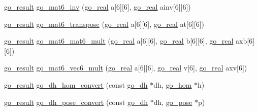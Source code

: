 \begin{DoxyCompactItemize}
\item 
\hyperlink{gotypes_8h_a55d48b38cd959f63c7e8db8337a9792a}{go\-\_\-result} \hyperlink{namespacegomotion_a6949f4b722debfa65cf5a2b84dc27a87}{go\-\_\-mat6\-\_\-inv} (\hyperlink{gotypes_8h_afd666a2393eebd71ee455846ac9def9b}{go\-\_\-real} a\mbox{[}6\mbox{]}\mbox{[}6\mbox{]}, \hyperlink{gotypes_8h_afd666a2393eebd71ee455846ac9def9b}{go\-\_\-real} ainv\mbox{[}6\mbox{]}\mbox{[}6\mbox{]})
\item 
\hyperlink{gotypes_8h_a55d48b38cd959f63c7e8db8337a9792a}{go\-\_\-result} \hyperlink{namespacegomotion_a8508fd2b999bdb9dc69e4394b42befe1}{go\-\_\-mat6\-\_\-transpose} (\hyperlink{gotypes_8h_afd666a2393eebd71ee455846ac9def9b}{go\-\_\-real} a\mbox{[}6\mbox{]}\mbox{[}6\mbox{]}, \hyperlink{gotypes_8h_afd666a2393eebd71ee455846ac9def9b}{go\-\_\-real} at\mbox{[}6\mbox{]}\mbox{[}6\mbox{]})
\item 
\hyperlink{gotypes_8h_a55d48b38cd959f63c7e8db8337a9792a}{go\-\_\-result} \hyperlink{namespacegomotion_a95d11938285c9d68ae2816f8659624d4}{go\-\_\-mat6\-\_\-mat6\-\_\-mult} (\hyperlink{gotypes_8h_afd666a2393eebd71ee455846ac9def9b}{go\-\_\-real} a\mbox{[}6\mbox{]}\mbox{[}6\mbox{]}, \hyperlink{gotypes_8h_afd666a2393eebd71ee455846ac9def9b}{go\-\_\-real} b\mbox{[}6\mbox{]}\mbox{[}6\mbox{]}, \hyperlink{gotypes_8h_afd666a2393eebd71ee455846ac9def9b}{go\-\_\-real} axb\mbox{[}6\mbox{]}\mbox{[}6\mbox{]})
\item 
\hyperlink{gotypes_8h_a55d48b38cd959f63c7e8db8337a9792a}{go\-\_\-result} \hyperlink{namespacegomotion_af5fb43481097fbb11023ccc2465ca810}{go\-\_\-mat6\-\_\-vec6\-\_\-mult} (\hyperlink{gotypes_8h_afd666a2393eebd71ee455846ac9def9b}{go\-\_\-real} a\mbox{[}6\mbox{]}\mbox{[}6\mbox{]}, \hyperlink{gotypes_8h_afd666a2393eebd71ee455846ac9def9b}{go\-\_\-real} v\mbox{[}6\mbox{]}, \hyperlink{gotypes_8h_afd666a2393eebd71ee455846ac9def9b}{go\-\_\-real} axv\mbox{[}6\mbox{]})
\item 
\hyperlink{gotypes_8h_a55d48b38cd959f63c7e8db8337a9792a}{go\-\_\-result} \hyperlink{namespacegomotion_afae46e4b13e18450c29190115f3b00cd}{go\-\_\-dh\-\_\-hom\-\_\-convert} (const \hyperlink{structgomotion_1_1go__dh}{go\-\_\-dh} $\ast$dh, \hyperlink{structgomotion_1_1go__hom}{go\-\_\-hom} $\ast$h)
\item 
\hyperlink{gotypes_8h_a55d48b38cd959f63c7e8db8337a9792a}{go\-\_\-result} \hyperlink{namespacegomotion_a14d7b8bcef4c4687c3df39767d5b43b5}{go\-\_\-dh\-\_\-pose\-\_\-convert} (const \hyperlink{structgomotion_1_1go__dh}{go\-\_\-dh} $\ast$dh, \hyperlink{structgomotion_1_1go__pose}{go\-\_\-pose} $\ast$p)

\end{DoxyCompactItemize}
